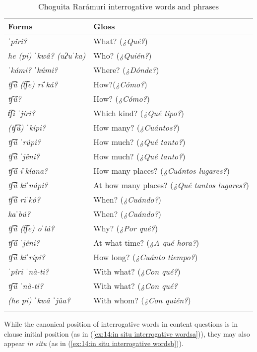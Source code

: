 \begin{table}[b]
\caption{Choguita Rarámuri interrogative words and phrases}
\label{tab:interrogative-words}

\begin{tabularx}{\textwidth}{lQ}
\lsptoprule
\textbf{Forms}  & \textbf{Gloss} \\
\midrule
\textit{ˈpîri?}  & What? (\textit{¿Qué?})\\
\textit{he (pi) ˈkwâ? (uʔuˈka)} & Who? (\textit{¿Quién?}) \\
\textit{ˈkámi? ˈkúmi?}  & Where? (\textit{¿Dónde?})\\
\textit{tʃ͡ú (t͡ʃe) riˈká?} & How?(\textit{¿Cómo?})\\
\textit{tʃ͡ú?} & How? (\textit{¿Cómo?})\\
\textit{t͡ʃi ˈjíri?} & Which kind? (\textit{¿Qué tipo?})\\
\textit{(tʃ͡ú) ˈkípi?} & How many? (\textit{¿Cuántos?})\\
\textit{tʃ͡ú ˈrúpi?} & How much? (\textit{¿Qué tanto?})\\
\textit{tʃ͡ú ˈjêni?} & How much? (\textit{¿Qué tanto?})\\
\textit{tʃ͡ú iˈkíana?} & How many places? (\textit{¿Cuántos lugares?})\\
\textit{tʃ͡ú kiˈnápi?} & At how many places? (\textit{¿Qué tantos lugares?})\\
\textit{tʃ͡ú riˈkó?}  & When? (\textit{¿Cuándo?})\\
\textit{kaˈbú?} & When? (\textit{¿Cuándo?})\\
\textit{tʃ͡ú (t͡ʃe) oˈlá?} & Why? (\textit{¿Por qué?})\\
\textit{tʃ͡ú ˈjêni?} & At what time? (\textit{¿A qué hora?})\\
\textit{tʃ͡ú kiˈrípi?} & How long? (\textit{¿Cuánto tiempo?})\\
\textit{ˈpîri ˈnà-ti?} & With what? (\textit{¿Con qué?})\\
\textit{tʃ͡ú ˈnà-ti?} & With what? (\textit{¿Con qué?}\\
\textit{(he pi) ˈkwâ ˈjûa?} & With whom? (\textit{¿Con quién?})\\
\lspbottomrule
\end{tabularx}
\end{table}

While the canonical position of interrogative words in content questions is in clause initial position (as in (\ref{ex:14:in situ interrogative wordsa})), they may also appear \textit{in situ} (as in (\ref{ex:14:in situ interrogative wordsb})).

